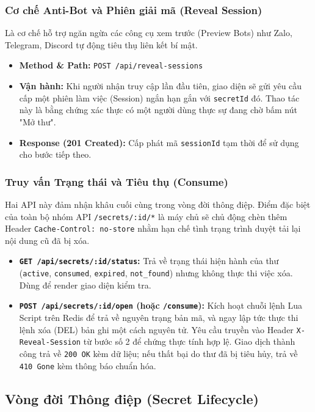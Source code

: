 \subsubsection{Cơ chế Anti-Bot và Phiên giải mã (Reveal Session)}
Là cơ chế hỗ trợ ngăn ngừa các công cụ xem trước (Preview Bots) như Zalo, Telegram, Discord tự động tiêu thụ liên kết bí mật.
\begin{itemize}
    \item \textbf{Method \& Path:} \texttt{POST /api/reveal-sessions}
    \item \textbf{Vận hành:} Khi người nhận truy cập lần đầu tiên, giao diện sẽ gửi yêu cầu cấp một phiên làm việc (Session) ngắn hạn gắn với \texttt{secretId} đó. Thao tác này là bằng chứng xác thực có một người dùng thực sự đang chờ bấm nút "Mở thư".
    \item \textbf{Response (201 Created):} Cấp phát mã \texttt{sessionId} tạm thời để sử dụng cho bước tiếp theo.
\end{itemize}

\subsubsection{Truy vấn Trạng thái và Tiêu thụ (Consume)}
Hai API này đảm nhận khâu cuối cùng trong vòng đời thông điệp. Điểm đặc biệt của toàn bộ nhóm API \texttt{/secrets/:id/*} là máy chủ sẽ chủ động chèn thêm Header \texttt{Cache-Control: no-store} nhằm hạn chế tình trạng trình duyệt tải lại nội dung cũ đã bị xóa.
\begin{itemize}
    \item \textbf{\texttt{GET /api/secrets/:id/status}:} Trả về trạng thái hiện hành của thư (\texttt{active}, \texttt{consumed}, \texttt{expired}, \texttt{not\_found}) nhưng không thực thi việc xóa. Dùng để render giao diện kiểm tra.
    \item \textbf{\texttt{POST /api/secrets/:id/open} (hoặc \texttt{/consume}):} Kích hoạt chuỗi lệnh Lua Script trên Redis để trả về nguyên trạng bản mã, và ngay lập tức thực thi lệnh xóa (DEL) bản ghi một cách nguyên tử. Yêu cầu truyền vào Header \texttt{X-Reveal-Session} từ bước số 2 để chứng thực tính hợp lệ. Giao dịch thành công trả về \texttt{200 OK} kèm dữ liệu; nếu thất bại do thư đã bị tiêu hủy, trả về \texttt{410 Gone} kèm thông báo chuẩn hóa.
\end{itemize}

\subsection{Vòng đời Thông điệp (Secret Lifecycle)}

